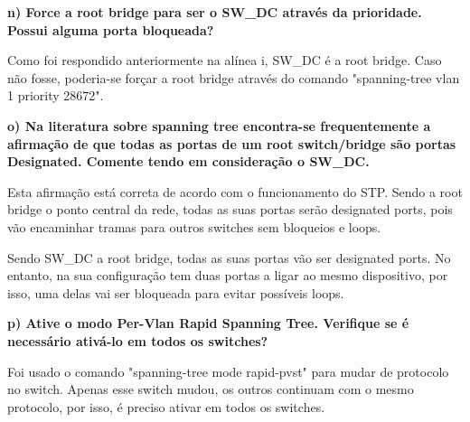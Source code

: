 \documentclass[11pt,english, openright, oneside]{book}
\begin{document}
\textbf{n) Force a root bridge para ser o SW\_DC através da prioridade. Possui alguma porta bloqueada?}
\vspace{0.2cm}

Como foi respondido anteriormente na alínea i, SW\_DC é a root bridge. Caso não
fosse, poderia-se forçar a root bridge através do comando "spanning-tree vlan 1
priority 28672".
\vspace{0.8cm}


\textbf{o) Na literatura sobre spanning tree encontra-se frequentemente a afirmação de que todas as portas de um root switch/bridge são portas Designated. Comente tendo em consideração o SW\_DC.}
\vspace{0.2cm}

Esta afirmação está correta de acordo com o funcionamento do STP. Sendo a root
bridge o ponto central da rede, todas as suas portas serão designated ports,
pois vão encaminhar tramas para outros switches sem bloqueios e loops.

Sendo SW\_DC a root bridge, todas as suas portas vão ser designated ports. No
entanto, na sua configuração tem duas portas a ligar ao mesmo dispositivo, por
isso, uma delas vai ser bloqueada para evitar possíveis loops.
\vspace{0.8cm}


\textbf{p) Ative o modo Per-Vlan Rapid Spanning Tree. Verifique se é necessário ativá-lo em todos os switches? }
\vspace{0.2cm}

Foi usado o comando "spanning-tree mode rapid-pvst" para mudar de protocolo no
switch. Apenas esse switch mudou, os outros continuam com o mesmo protocolo, por
isso, é preciso ativar em todos os switches.
\end{document}
